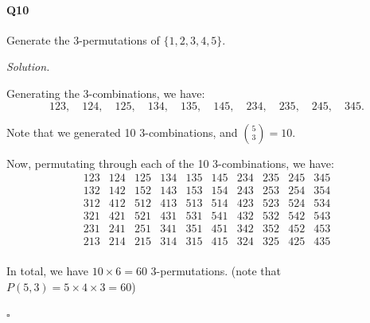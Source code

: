 \documentclass{report}
\begin{document}
 
\paragraph{Q10} Generate the 3-permutations of $\{1,2,3,4,5\}$.

\medskip \noindent \textit{Solution.} 

\noindent
Generating the 3-combinations, we have:
\[123,\quad124,\quad125,\quad134,\quad135,\quad145,\quad234,\quad235,\quad245,\quad345.\]

\noindent
Note that we generated 10 3-combinations, and $\displaystyle{{5 \choose 3}} = 10.$

\bigskip
\noindent
Now, permutating through each of the 10 3-combinations, we have:
\[
\begin{array}{|c|c|c|c|c|c|c|c|c|c|}
    123 & 124 & 125 & 134 & 135 & 145 & 234 & 235 & 245 & 345 \\
    132 & 142 & 152 & 143 & 153 & 154 & 243 & 253 & 254 & 354 \\
    312 & 412 & 512 & 413 & 513 & 514 & 423 & 523 & 524 & 534 \\
    321 & 421 & 521 & 431 & 531 & 541 & 432 & 532 & 542 & 543 \\
    231 & 241 & 251 & 341 & 351 & 451 & 342 & 352 & 452 & 453 \\
    213 & 214 & 215 & 314 & 315 & 415 & 324 & 325 & 425 & 435 \\
\end{array}
\]

\noindent
In total, we have $10 \times 6 = 60$ 3-permutations. (note that $P(5,3) = 5 \times 4 \times 3 = 60$)



\hfill $\square$
\end{document}
